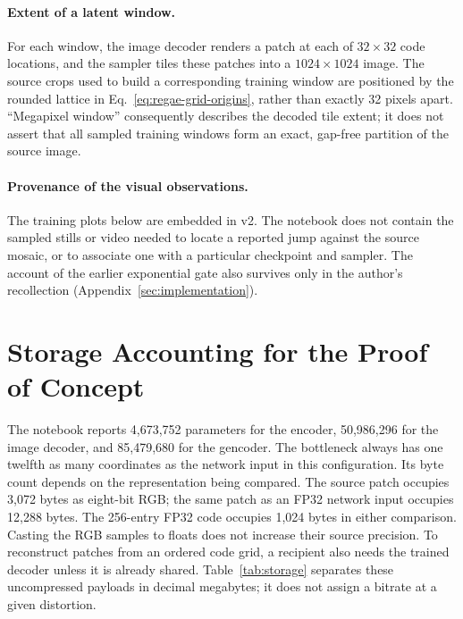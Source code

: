 \paragraph{Extent of a latent window.}
For each window, the image decoder renders a patch at each of $32\times32$ code locations, and the sampler tiles these patches into a $1024\times1024$ image. The source crops used to build a corresponding training window are positioned by the rounded lattice in Eq.~\eqref{eq:regae-grid-origins}, rather than exactly 32 pixels apart. ``Megapixel window'' consequently describes the decoded tile extent; it does not assert that all sampled training windows form an exact, gap-free partition of the source image.

\paragraph{Provenance of the visual observations.}
The training plots below are embedded in v2. The notebook does not contain the sampled stills or video needed to locate a reported jump against the source mosaic, or to associate one with a particular checkpoint and sampler. The account of the earlier exponential gate also survives only in the author's recollection (Appendix~\ref{sec:implementation}).

\section{Storage Accounting for the Proof of Concept}
\label{sec:storage}

The notebook reports 4,673,752 parameters for the encoder, 50,986,296 for the image decoder, and 85,479,680 for the gencoder. The bottleneck always has one twelfth as many coordinates as the network input in this configuration. Its byte count depends on the representation being compared. The source patch occupies 3,072 bytes as eight-bit RGB; the same patch as an FP32 network input occupies 12,288 bytes. The 256-entry FP32 code occupies 1,024 bytes in either comparison. Casting the RGB samples to floats does not increase their source precision. To reconstruct patches from an ordered code grid, a recipient also needs the trained decoder unless it is already shared. Table~\ref{tab:storage} separates these uncompressed payloads in decimal megabytes; it does not assign a bitrate at a given distortion.

